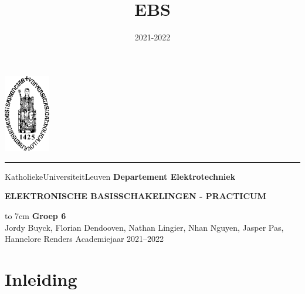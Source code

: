 \documentclass{report}
\title{EBS}
\author{}
\date{2021-2022}
\begin{document}
	
	\begin{titlepage}
		\newpage
		\thispagestyle{empty}
		\frenchspacing
		\hspace{-0.2cm}
		\includegraphics[height=3.4cm]{sedes}
		\hspace{0.2cm}
		\rule{0.5pt}{3.4cm}
		\hspace{0.2cm}
		\begin{minipage}[b]{8cm}
			\Large{Katholieke\newline Universiteit\newline Leuven}\smallskip\newline
			\large{}\smallskip\newline
			\textbf{Departement \newline Elektrotechniek}\smallskip
		\end{minipage}
		\vspace*{3.2cm}\vfill
		\begin{center}
			\begin{minipage}[t]{\textwidth}
				\begin{center}
					\LARGE{\rm{\textbf{\uppercase{Elektronische basisschakelingen - Practicum}}}}\\[5mm]
				\end{center}
			\end{minipage}
		\end{center}
		\vfill
		\hfill\begin{center}%
			\vbox to 7cm{\vfill\noindent
				{%
					{\rm \textbf{Groep 6}} \\[2mm]
					{\rm Jordy Buyck, Florian Dendooven, Nathan Lingier, Nhan Nguyen, Jasper Pas, Hannelore Renders}
					{\rm Academiejaar 2021--2022}
				}
			}
		\end{center}
		
	\end{titlepage}
	\pagebreak
	
\tableofcontents

\chapter{Inleiding}
\end{document}
